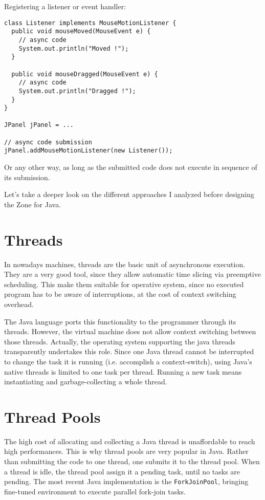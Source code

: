 Registering a listener or event handler:
\begin{lstlisting}
class Listener implements MouseMotionListener {
  public void mouseMoved(MouseEvent e) {
    // async code
    System.out.println("Moved !");
  }

  public void mouseDragged(MouseEvent e) {
    // async code
    System.out.println("Dragged !");
  }
}

JPanel jPanel = ...

// async code submission
jPanel.addMouseMotionListener(new Listener());
\end{lstlisting}

Or any other way, as long as the submitted code does not execute in sequence of its submission.

Let's take a deeper look on the different approaches I analyzed before designing the Zone for Java.


\section{Threads}

In nowadays machines, threads are the basic unit of asynchronous execution. They are a very good tool, since they allow automatic time slicing via preemptive scheduling. This make them suitable for operative system, since no executed program has to be aware of interruptions, at the cost of context switching overhead.

The Java language ports this functionality to the programmer through its threads. However, the virtual machine does not allow context switching between those threads. Actually, the operating system supporting the java threads transparently undertakes this role. Since one Java thread cannot be interrupted to change the task it is running (i.e. accomplish a context-switch), using Java's native threads is limited to one task per thread. Running a new task means instantiating and garbage-collecting a whole thread.

\section{Thread Pools}

The high cost of allocating and collecting a Java thread is unaffordable to reach high performances. This is why thread pools are very popular in Java. Rather than submitting the code to one thread, one submits it to the thread pool. When a thread is idle, the thread pool assign it a pending task, until no tasks are pending. The most recent Java implementation is the \lstinline{ForkJoinPool}, bringing fine-tuned environment to execute parallel fork-join tasks.

